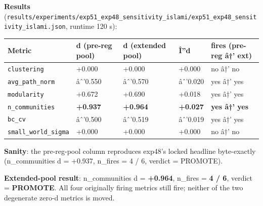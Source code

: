 \documentclass[
]{article}
\newcounter{none} %
\begin{document}
\textbf{Results}
(\texttt{results/experiments/exp51\_exp48\_sensitivity\_islami/exp51\_exp48\_sensitivity\_islami.json},
runtime 120 s):

{\def\LTcaptype{none} %
\begin{longtable}[]{@{}
  >{\raggedright\arraybackslash}p{}
  >{\raggedleft\arraybackslash}p{}
  >{\raggedleft\arraybackslash}p{}
  >{\raggedleft\arraybackslash}p{}
  >{\raggedright\arraybackslash}p{}@{}}
\toprule\noalign{}
\begin{minipage}[b]{\linewidth}\raggedright
Metric
\end{minipage} & \begin{minipage}[b]{\linewidth}\raggedleft
d (pre-reg pool)
\end{minipage} & \begin{minipage}[b]{\linewidth}\raggedleft
d (extended pool)
\end{minipage} & \begin{minipage}[b]{\linewidth}\raggedleft
Î''d
\end{minipage} & \begin{minipage}[b]{\linewidth}\raggedright
fires (pre-reg â†' ext)
\end{minipage} \\
\midrule\noalign{}
\endhead
\bottomrule\noalign{}
\endlastfoot
\texttt{clustering} & +0.000 & +0.000 & +0.000 & no â†' no \\
\texttt{avg\_path\_norm} & âˆ'0.550 & âˆ'0.570 & âˆ'0.020 & yes â†'
yes \\
\texttt{modularity} & +0.672 & +0.690 & +0.018 & yes â†' yes \\
\texttt{n\_communities} & \textbf{+0.937} & \textbf{+0.964} &
\textbf{+0.027} & \textbf{yes â†' yes} \\
\texttt{bc\_cv} & âˆ'0.500 & âˆ'0.519 & âˆ'0.019 & yes â†' yes \\
\texttt{small\_world\_sigma} & +0.000 & +0.000 & +0.000 & no â†' no \\
\end{longtable}
}

\textbf{Sanity}: the pre-reg-pool column reproduces exp48's locked
headline byte-exactly (n\_communities d = +0.937, n\_fires = 4 / 6,
verdict = PROMOTE).

\textbf{Extended-pool result}: n\_communities d = \textbf{+0.964},
n\_fires = \textbf{4 / 6}, verdict = \textbf{PROMOTE}. All four
originally firing metrics still fire; neither of the two degenerate
zero-d metrics is moved.
\end{document}
